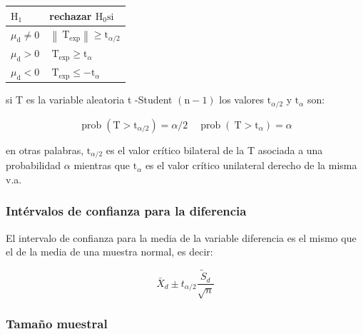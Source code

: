 \documentclass[
]{article}
\begin{document}
\begin{longtable}[]{@{}
  >{\centering\arraybackslash}p{}
  >{\centering\arraybackslash}p{}@{}}
\toprule\noalign{}
\begin{minipage}[b]{\linewidth}\centering
\(\mathrm{H}_{1}\)
\end{minipage} & \begin{minipage}[b]{\linewidth}\centering
rechazar \(\mathrm{H}_{0} \mathrm{si}\)
\end{minipage} \\
\midrule\noalign{}
\endhead
\bottomrule\noalign{}
\endlastfoot
\(\mu_{\mathrm{d}} \neq 0\) & \(\left\|\mathrm{~T}_{\exp }\right\| \geq \mathrm{t}_{\alpha / 2}\) \\
\(\mu_{\mathrm{d}}>0\) & \(\mathrm{~T}_{\exp } \geq \mathrm{t}_{\alpha}\) \\
\(\mu_{\mathrm{d}}<0\) & \(\mathrm{~T}_{\exp } \leq-\mathrm{t}_{\alpha}\) \\
\end{longtable}

si T es la variable aleatoria t -Student \((\mathrm{n}-1)\) los valores \(\mathrm{t}_{\alpha / 2}\) y \(\mathrm{t}_{\alpha}\) son:

\[
\operatorname{prob}\left(\mathrm{T}>\mathrm{t}_{\alpha / 2}\right)=\alpha / 2 \quad \operatorname{prob}\left(\mathrm{~T}>\mathrm{t}_{\alpha}\right)=\alpha
\]

en otras palabras, \(\mathrm{t}_{\alpha / 2}\) es el valor crítico bilateral de la T asociada a una probabilidad \(\alpha\) mientras que \(\mathrm{t}_{\alpha}\) es el valor crítico unilateral derecho de la misma v.a.

\subsubsection{Intérvalos de confianza para la diferencia}\label{intuxe9rvalos-de-confianza-para-la-diferencia}

El intervalo de confianza para la media de la variable diferencia es el mismo que el de la media de una muestra normal, es decir:

\[
\bar{X}_{d} \pm t_{\alpha / 2} \frac{\widetilde{S}_{d}}{\sqrt{n}}
\]

\subsubsection{Tamaño muestral}\label{tamauxf1o-muestral}
\end{document}
